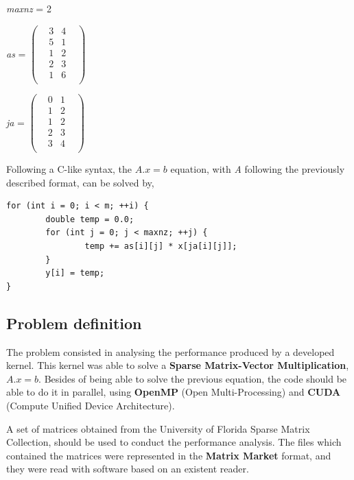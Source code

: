 \documentclass[12pt]{article}
\begin{document}
\begin{center}
\textit{maxnz}  =  2 
\linebreak
\linebreak

\begin{minipage}{.4\textwidth}
  \center
  \textit{as}  =   
$
\begin{pmatrix}
    & 3 & 4 & \\
    & 5 & 1 & \\
    & 1 & 2 & \\
    & 2 & 3 & \\
    & 1 & 6 & \\
\end{pmatrix}
$
\end{minipage}%
\begin{minipage}{.4\textwidth}
 \center
  \textit{ja}  =   
$
\begin{pmatrix}
    & 0 & 1 & \\
    & 1 & 2 & \\
    & 1 & 2 & \\
    & 2 & 3 & \\
    & 3 & 4 & \\
\end{pmatrix}
$
\end{minipage}
\linebreak
\end{center}

\par Following a C-like syntax, the $A . x = b$ equation, with \textit{A} following the previously described format, can be solved by,


\begin{lstlisting}[style=centered]
for (int i = 0; i < m; ++i) {
		double temp = 0.0;
		for (int j = 0; j < maxnz; ++j) {
				temp += as[i][j] * x[ja[i][j]];
		}
		y[i] = temp;
}	
\end{lstlisting}

 
\subsection*{Problem definition}

\par The problem consisted in analysing the performance produced by a developed kernel. This kernel was able to solve a \textbf{Sparse Matrix-Vector Multiplication}, $A.x = b$. Besides of being able to solve the previous equation, the code should be able to do it in parallel, using \textbf{OpenMP} (Open Multi-Processing) and \textbf{CUDA} (Compute Unified Device Architecture).
\par A set of matrices obtained from the University of Florida Sparse Matrix Collection\cite{sparse-matrices}, should be used to conduct the performance analysis. The files which contained the matrices were represented in the \textbf{Matrix Market} format, and they were read with software based on an existent reader. \cite{matrix-reader} 
\end{document}
